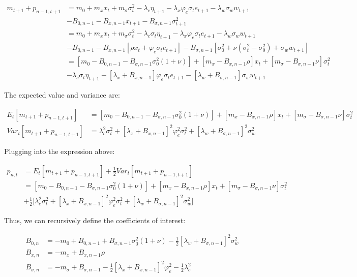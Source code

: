 \documentclass{article}
\begin{document}
\begin{enumerate}
\begin{align*}
m_{t+1} + p_{n-1,t+1} 
&=  m_0 + m_x x_t + m_\sigma \sigma_t^2 - \lambda_c \eta_{t+1} - \lambda_x \varphi_e \sigma_t e_{t+1} - \lambda_w \sigma_w w_{t+1}\\
&- B_{0, n-1} - B_{x,n-1} x_{t+1} - B_{\sigma,n-1} \sigma_{t+1}^2 \\
&=  m_0 + m_x x_t + m_\sigma \sigma_t^2 - \lambda_c \sigma_t\eta_{t+1} - \lambda_x \varphi_e \sigma_t e_{t+1} - \lambda_w \sigma_w w_{t+1}\\
&- B_{0, n-1} - B_{x,n-1} [\rho x_t + \varphi_e \sigma_t e_{t+1}] - B_{\sigma,n-1} [\sigma_0^2 + \nu (\sigma_t^2 - \sigma_0^2) + \sigma_w w_{t+1}] \\
&=  [m_0 - B_{0, n-1} - B_{\sigma,n-1} \sigma_0^2(1+\nu)] + [m_x - B_{x,n-1}\rho]x_t + [m_\sigma - B_{\sigma,n-1}\nu]\sigma_t^2 \\
&- \lambda_c \sigma_t\eta_{t+1} - [\lambda_x + B_{x,n-1}] \varphi_e \sigma_t e_{t+1} - [\lambda_w + B_{\sigma,n-1}]\sigma_w w_{t+1}
\end{align*}

The expected value and variance are:

\begin{align*}
E_t[m_{t+1} + p_{n-1,t+1} ] &= [m_0 - B_{0, n-1} - B_{\sigma,n-1} \sigma_0^2(1+\nu)] + [m_x - B_{x,n-1}\rho]x_t + [m_\sigma - B_{\sigma,n-1}\nu]\sigma_t^2\\
Var_t[m_{t+1} + p_{n-1,t+1}] &= \lambda_c^2\sigma_t^2 + [\lambda_x + B_{x,n-1}]^2 \varphi_e^2 \sigma_t^2 + [\lambda_w + B_{\sigma,n-1}]^2\sigma_w^2
\end{align*}

Plugging into the expression above:

\begin{align*}
p_{n,t} &= E_t[m_{t+1} + p_{n-1,t+1}] + \frac{1}{2} Var_t[m_{t+1} + p_{n-1,t+1}]\\
&= [m_0 - B_{0, n-1} - B_{\sigma,n-1} \sigma_0^2(1+\nu)] + [m_x - B_{x,n-1}\rho]x_t + [m_\sigma - B_{\sigma,n-1}\nu]\sigma_t^2 \\
&+ \frac{1}{2} \Bigg[\lambda_c^2\sigma_t^2 + [\lambda_x + B_{x,n-1}]^2 \varphi_e^2 \sigma_t^2 + [\lambda_w + B_{\sigma,n-1}]^2\sigma_w^2\Bigg]
\end{align*}

\pagebreak

Thus, we can recursively define the coefficients of interest:

\begin{align*}
B_{0,n} &= -m_0 + B_{0, n-1} + B_{\sigma,n-1} \sigma_0^2(1+\nu) - \frac{1}{2} [\lambda_w + B_{\sigma,n-1}]^2\sigma_w^2\\
B_{x, n} &= -m_x + B_{x, n-1}\rho\\
B_{\sigma, n} &= -m_\sigma + B_{\sigma,n-1} - \frac{1}{2}[\lambda_x + B_{x,n-1}]^2\varphi_e^2 - \frac{1}{2} \lambda_c^2
\end{align*}


\end{enumerate}
\end{document}
